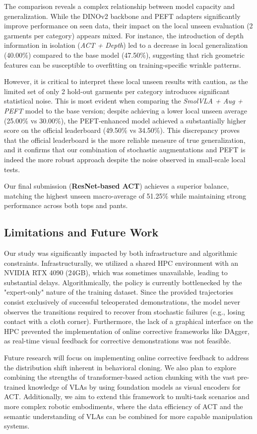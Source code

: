 The comparison reveals a complex relationship between model capacity and generalization. While the DINOv2 backbone and PEFT adapters significantly improve performance on seen data, their impact on the local unseen evaluation (2 garments per category) appears mixed. For instance, the introduction of depth information in isolation (\textit{ACT + Depth}) led to a decrease in local generalization (40.00\%) compared to the base model (47.50\%), suggesting that rich geometric features can be susceptible to overfitting on training-specific wrinkle patterns. 

However, it is critical to interpret these local unseen results with caution, as the limited set of only 2 hold-out garments per category introduces significant statistical noise. This is most evident when comparing the \textit{SmolVLA + Aug + PEFT} model to the base version; despite achieving a lower local unseen average (25.00\% vs 30.00\%), the PEFT-enhanced model achieved a substantially higher score on the official leaderboard (49.50\% vs 34.50\%). This discrepancy proves that the official leaderboard is the more reliable measure of true generalization, and it confirms that our combination of stochastic augmentations and PEFT is indeed the more robust approach despite the noise observed in small-scale local tests.

Our final submission (\textbf{ResNet-based ACT}) achieves a superior balance, matching the highest unseen macro-average of 51.25\% while maintaining strong performance across both tops and pants.

\subsection{Limitations and Future Work}
\label{sec:limitations}
Our study was significantly impacted by both infrastructure and algorithmic constraints. Infrastructurally, we utilized a shared HPC environment with an NVIDIA RTX 4090 (24GB), which was sometimes unavailable, leading to substantial delays. Algorithmically, the policy is currently bottlenecked by the "expert-only" nature of the training dataset. Since the provided trajectories consist exclusively of successful teleoperated demonstrations, the model never observes the transitions required to recover from stochastic failures (e.g., losing contact with a cloth corner). Furthermore, the lack of a graphical interface on the HPC prevented the implementation of online corrective frameworks like DAgger, as real-time visual feedback for corrective demonstrations was not feasible.

Future research will focus on implementing online corrective feedback to address the distribution shift inherent in behavioral cloning. We also plan to explore combining the strengths of transformer-based action chunking with the vast pre-trained knowledge of VLAs by using foundation models as visual encoders for ACT. Additionally, we aim to extend this framework to multi-task scenarios and more complex robotic embodiments, where the data efficiency of ACT and the semantic understanding of VLAs can be combined for more capable manipulation systems.

    